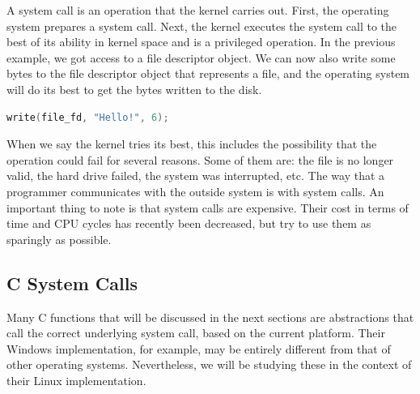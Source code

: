 A system call is an operation that the kernel carries out.
First, the operating system prepares a system call.
Next, the kernel executes the system call to the best of its ability in kernel space and is a privileged operation.
In the previous example, we got access to a file descriptor object.
We can now also write some bytes to the file descriptor object that represents a file, and the operating system will do its best to get the bytes written to the disk.

\begin{lstlisting}[language=C]
write(file_fd, "Hello!", 6);
\end{lstlisting}

When we say the kernel tries its best, this includes the possibility that the operation could fail for several reasons.
Some of them are: the file is no longer valid, the hard drive failed, the system was interrupted, etc.
The way that a programmer communicates with the outside system is with system calls.
An important thing to note is that system calls are expensive.
Their cost in terms of time and CPU cycles has recently been decreased, but try to use them as sparingly as possible.

\subsection{C System Calls}

Many C functions that will be discussed in the next sections are abstractions that call the correct underlying system call, based on the current platform. 
Their Windows implementation, for example, may be entirely different from that of other operating systems.
Nevertheless, we will be studying these in the context of their Linux implementation.

